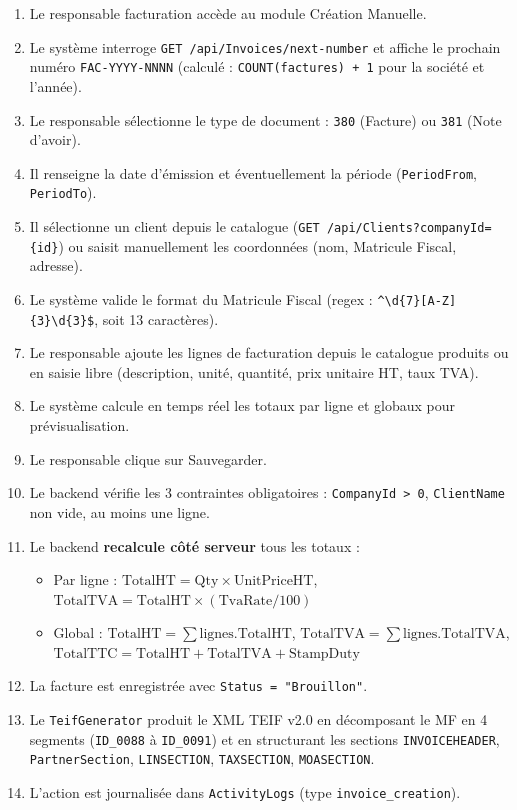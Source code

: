 \documentclass[a4paper,12pt]{report}
\begin{document}
\begin{enumerate}[nosep]
    \item Le responsable facturation accède au module \og{}Création Manuelle\fg{}.
    \item Le système interroge \texttt{GET /api/Invoices/next-number} et affiche le prochain numéro \texttt{FAC-YYYY-NNNN} (calculé : \texttt{COUNT(factures) + 1} pour la société et l'année).
    \item Le responsable sélectionne le type de document : \texttt{380} (Facture) ou \texttt{381} (Note d'avoir).
    \item Il renseigne la date d'émission et éventuellement la période (\texttt{PeriodFrom}, \texttt{PeriodTo}).
    \item Il sélectionne un client depuis le catalogue (\texttt{GET /api/Clients?companyId=\{id\}}) ou saisit manuellement les coordonnées (nom, Matricule Fiscal, adresse).
    \item Le système valide le format du Matricule Fiscal (regex : \texttt{\textasciicircum\textbackslash d\{7\}[A-Z]\{3\}\textbackslash d\{3\}\$}, soit 13 caractères).
    \item Le responsable ajoute les lignes de facturation depuis le catalogue produits ou en saisie libre (description, unité, quantité, prix unitaire HT, taux TVA).
    \item Le système calcule en temps réel les totaux par ligne et globaux pour prévisualisation.
    \item Le responsable clique sur \og{}Sauvegarder\fg{}.
    \item Le backend vérifie les 3 contraintes obligatoires : \texttt{CompanyId > 0}, \texttt{ClientName} non vide, au moins une ligne.
    \item Le backend \textbf{recalcule côté serveur} tous les totaux :
    \begin{itemize}[nosep]
        \item Par ligne : $\text{TotalHT} = \text{Qty} \times \text{UnitPriceHT}$, $\text{TotalTVA} = \text{TotalHT} \times (\text{TvaRate} / 100)$
        \item Global : $\text{TotalHT} = \sum \text{lignes.TotalHT}$, $\text{TotalTVA} = \sum \text{lignes.TotalTVA}$, $\text{TotalTTC} = \text{TotalHT} + \text{TotalTVA} + \text{StampDuty}$
    \end{itemize}
    \item La facture est enregistrée avec \texttt{Status = "Brouillon"}.
    \item Le \texttt{TeifGenerator} produit le XML TEIF v2.0 en décomposant le MF en 4 segments (\texttt{ID\_0088} à \texttt{ID\_0091}) et en structurant les sections \texttt{INVOICEHEADER}, \texttt{PartnerSection}, \texttt{LINSECTION}, \texttt{TAXSECTION}, \texttt{MOASECTION}.
    \item L'action est journalisée dans \texttt{ActivityLogs} (type \texttt{invoice\_creation}).
\end{enumerate}
\end{document}

